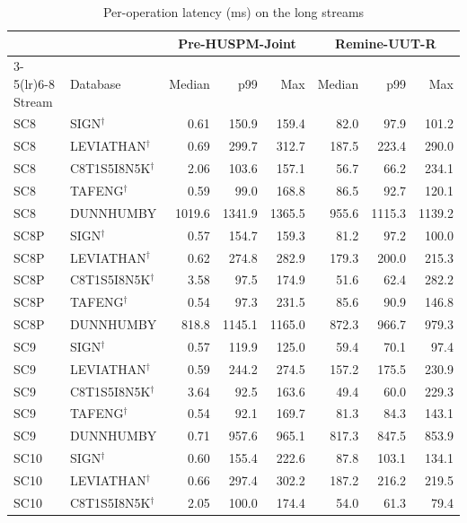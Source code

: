 \begin{table}[!htbp]\centering
\caption{Per-operation latency (ms) on the long streams}\label{tab:latency}
\setlength{\tabcolsep}{4pt}
\begin{tabular*}{\textwidth}{@{\extracolsep\fill}llrrrrrr}\toprule
 & & \multicolumn{3}{c}{Pre-HUSPM-Joint} & \multicolumn{3}{c}{Remine-UUT-R} \\
\cmidrule(lr){3-5}\cmidrule(lr){6-8}
Stream & Database & Median & p99 & Max & Median & p99 & Max \\\midrule
SC8 & SIGN$^{\dagger}$ & 0.61 & 150.9 & 159.4 & 82.0 & 97.9 & 101.2 \\
SC8 & LEVIATHAN$^{\dagger}$ & 0.69 & 299.7 & 312.7 & 187.5 & 223.4 & 290.0 \\
SC8 & C8T1S5I8N5K$^{\dagger}$ & 2.06 & 103.6 & 157.1 & 56.7 & 66.2 & 234.1 \\
SC8 & TAFENG$^{\dagger}$ & 0.59 & 99.0 & 168.8 & 86.5 & 92.7 & 120.1 \\
SC8 & DUNNHUMBY & 1019.6 & 1341.9 & 1365.5 & 955.6 & 1115.3 & 1139.2 \\
SC8P & SIGN$^{\dagger}$ & 0.57 & 154.7 & 159.3 & 81.2 & 97.2 & 100.0 \\
SC8P & LEVIATHAN$^{\dagger}$ & 0.62 & 274.8 & 282.9 & 179.3 & 200.0 & 215.3 \\
SC8P & C8T1S5I8N5K$^{\dagger}$ & 3.58 & 97.5 & 174.9 & 51.6 & 62.4 & 282.2 \\
SC8P & TAFENG$^{\dagger}$ & 0.54 & 97.3 & 231.5 & 85.6 & 90.9 & 146.8 \\
SC8P & DUNNHUMBY & 818.8 & 1145.1 & 1165.0 & 872.3 & 966.7 & 979.3 \\
SC9 & SIGN$^{\dagger}$ & 0.57 & 119.9 & 125.0 & 59.4 & 70.1 & 97.4 \\
SC9 & LEVIATHAN$^{\dagger}$ & 0.59 & 244.2 & 274.5 & 157.2 & 175.5 & 230.9 \\
SC9 & C8T1S5I8N5K$^{\dagger}$ & 3.64 & 92.5 & 163.6 & 49.4 & 60.0 & 229.3 \\
SC9 & TAFENG$^{\dagger}$ & 0.54 & 92.1 & 169.7 & 81.3 & 84.3 & 143.1 \\
SC9 & DUNNHUMBY & 0.71 & 957.6 & 965.1 & 817.3 & 847.5 & 853.9 \\
SC10 & SIGN$^{\dagger}$ & 0.60 & 155.4 & 222.6 & 87.8 & 103.1 & 134.1 \\
SC10 & LEVIATHAN$^{\dagger}$ & 0.66 & 297.4 & 302.2 & 187.2 & 216.2 & 219.5 \\
SC10 & C8T1S5I8N5K$^{\dagger}$ & 2.05 & 100.0 & 174.4 & 54.0 & 61.3 & 79.4 \\

\end{tabular*}
\end{table}
